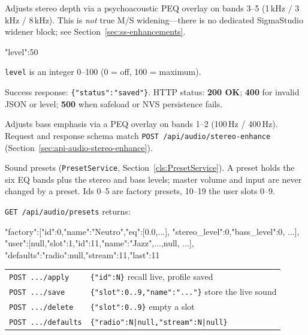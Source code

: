 \label{sec:api-audio-stereo-enhance}

Adjusts stereo depth via a psychoacoustic PEQ overlay on bands 3--5
(1\,kHz / 3\,kHz / 8\,kHz). This is \emph{not} true M/S widening---there
is no dedicated SigmaStudio widener block; see
Section~\ref{sec:ss-enhancements}.

\begin{drnote}
\begin{drcode}[JSON]
{"level":50}
\end{drcode}
\texttt{level} is an integer 0--100 (0 = off, 100 = maximum).
\end{drnote}

Success response: \texttt{\{"status":"saved"\}}. HTTP status:
\textbf{200 OK}; \textbf{400} for invalid JSON or level; \textbf{500}
when safeload or NVS persistence fails.

\label{sec:api-audio-bass-enhance}

Adjusts bass emphasis via a PEQ overlay on bands 1--2 (100\,Hz /
400\,Hz). Request and response schema match
\texttt{POST /api/audio/stereo-enhance} (Section~\ref{sec:api-audio-stereo-enhance}).

\label{sec:api-audio-presets}

Sound presets (\texttt{PresetService}, Section~\ref{cls:PresetService}). A
preset holds the six EQ bands plus the stereo and bass levels; master
volume and input are never changed by a preset. Ids 0--5 are factory
presets, 10--19 the user slots 0--9.

\texttt{GET /api/audio/presets} returns:
\begin{drcode}[JSON]
{"factory":[{"id":0,"name":"Neutro","eq":[0.0,...],
             "stereo_level":0,"bass_level":0}, ...],
 "user":[null,{"slot":1,"id":11,"name":"Jazz",...},null, ...],
 "defaults":{"radio":null,"stream":11},"last":11}
\end{drcode}

\begin{tabular}{@{}ll@{}}
\texttt{POST .../apply} & \texttt{\{"id":N\}} recall live, profile saved \\
\texttt{POST .../save} & \texttt{\{"slot":0..9,"name":"..."\}} store the live sound \\
\texttt{POST .../delete} & \texttt{\{"slot":0..9\}} empty a slot \\
\texttt{POST .../defaults} & \texttt{\{"radio":N|null,"stream":N|null\}} \\
\end{tabular}

